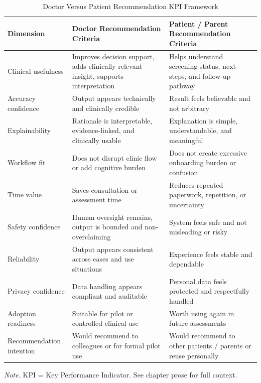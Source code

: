 {
\begin{xltabular}{\textwidth}{@{} >{\raggedright\arraybackslash}p{2.0cm} L L @{}}
\caption[Doctor Versus Patient Recommendation KPI Framework]{Doctor Versus Patient Recommendation KPI Framework}\label{tab:doctor_patient_recommendation_kpi} \\
\toprule
\textbf{Dimension} & \textbf{Doctor Recommendation Criteria} & \textbf{Patient / Parent Recommendation Criteria} \\
\midrule
\endfirsthead
\endhead
\bottomrule
\endlastfoot
Clinical usefulness & Improves decision support, adds clinically relevant insight, supports interpretation & Helps understand screening status, next steps, and follow-up pathway \\
\addlinespace
Accuracy confidence & Output appears technically and clinically credible & Result feels believable and not arbitrary \\
\addlinespace
Explainability & Rationale is interpretable, evidence-linked, and clinically usable & Explanation is simple, understandable, and meaningful \\
\addlinespace
Workflow fit & Does not disrupt clinic flow or add cognitive burden & Does not create excessive onboarding burden or confusion \\
\addlinespace
Time value & Saves consultation or assessment time & Reduces repeated paperwork, repetition, or uncertainty \\
\addlinespace
Safety confidence & Human oversight remains, output is bounded and non-overclaiming & System feels safe and not misleading or risky \\
\addlinespace
Reliability & Output appears consistent across cases and use situations & Experience feels stable and dependable \\
\addlinespace
Privacy confidence & Data handling appears compliant and auditable & Personal data feels protected and respectfully handled \\
\addlinespace
Adoption readiness & Suitable for pilot or controlled clinical use & Worth using again in future assessments \\
\addlinespace
Recommendation intention & Would recommend to colleagues or for formal pilot use & Would recommend to other patients / parents or reuse personally \\
\end{xltabular}}
\vspace{0.3em}\noindent\textit{Note.} KPI = Key Performance Indicator. See chapter prose for full context.


